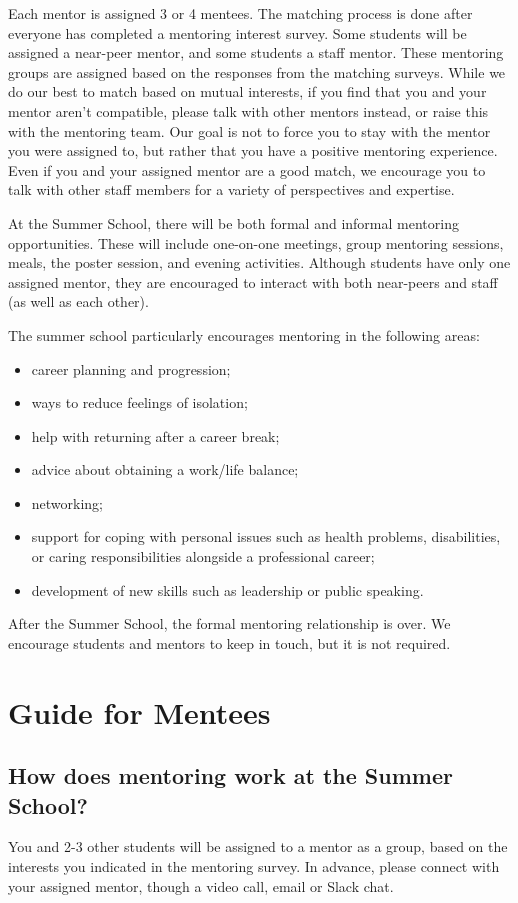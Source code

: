 \documentclass[titlepage]{article}
\let\oldsection\section
\renewcommand{\section}{\clearpage\oldsection}
\begin{document}
Each mentor is assigned 3 or 4 mentees. The matching process is done after everyone has completed a mentoring interest survey.  Some students will be assigned a near-peer mentor, and some students a staff mentor. These mentoring groups are assigned based on the responses from the matching surveys. While we do our best to match based on mutual interests, if you find that you and your mentor aren't compatible, please talk with other mentors instead, or raise this with the mentoring team. Our goal is not to force you to stay with the mentor you were assigned to, but rather that you have a positive mentoring experience. Even if you and your assigned mentor are a good match, we encourage you to talk with other staff members for a variety of perspectives and expertise.

At the Summer School, there will be both formal and informal mentoring opportunities. These will include one-on-one meetings, group mentoring sessions, meals, the poster session, and evening activities. Although students have only one assigned mentor, they are encouraged to interact with both near-peers and staff (as well as each other).

The summer school particularly encourages mentoring in the following areas:

\begin{itemize}
\item career planning and progression;
\item ways to reduce feelings of isolation;
\item help with returning after a career break;
\item advice about obtaining a work/life balance;
\item networking;
\item support for coping with personal issues such as health problems, disabilities, or caring responsibilities alongside a professional career;
\item development of new skills such as leadership or public speaking.
\end{itemize}

After the Summer School, the formal mentoring relationship is over. We encourage students and mentors to keep in touch, but it is not required.

\section{Guide for Mentees}
\label{sec:org1848cfc}
\subsection{How does mentoring work at the Summer School?}
\label{sec:orgd21f55b}
You and 2-3 other students will be assigned to a mentor as a group, based on the interests you indicated in the mentoring survey.  In advance, please connect with your assigned mentor, though a video call, email or Slack chat.
\end{document}
